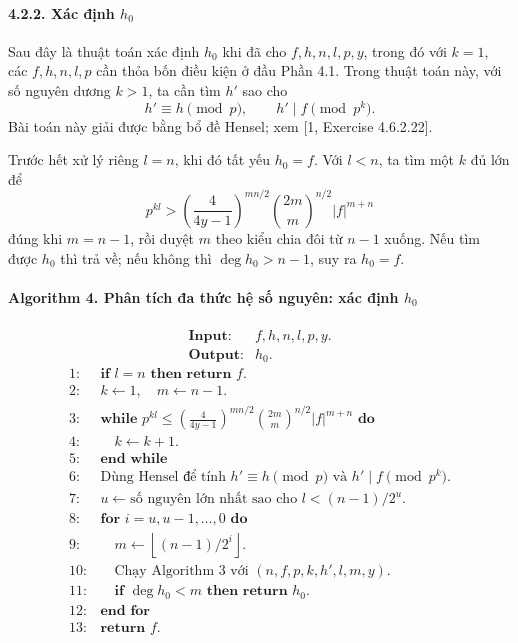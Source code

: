 \documentclass[11pt]{article}
\begin{document}
\paragraph{4.2.2. Xác định \(h_0\)}

Sau đây là thuật toán xác định \(h_0\) khi đã cho \(f,h,n,l,p,y\), trong đó
với \(k=1\), các \(f,h,n,l,p\) cần thỏa bốn điều kiện ở đầu Phần 4.1. Trong
thuật toán này, với số nguyên dương \(k>1\), ta cần tìm \(h'\) sao cho
\[
  h'\equiv h\pmod p,\qquad h'\mid f\pmod {p^k}.
\]
Bài toán này giải được bằng bổ đề Hensel; xem [1, Exercise 4.6.2.22].

Trước hết xử lý riêng \(l=n\), khi đó tất yếu \(h_0=f\). Với \(l<n\), ta tìm
một \(k\) đủ lớn để
\[
  p^{kl}>
  \left(\frac{4}{4y-1}\right)^{mn/2}
  \binom{2m}{m}^{n/2}|f|^{m+n}
\]
đúng khi \(m=n-1\), rồi duyệt \(m\) theo kiểu chia đôi từ \(n-1\) xuống. Nếu
tìm được \(h_0\) thì trả về; nếu không thì \(\deg h_0>n-1\), suy ra \(h_0=f\).

\paragraph{Algorithm 4. Phân tích đa thức hệ số nguyên: xác định \(h_0\)}
\[
\begin{array}{ll}
\textbf{Input:} & f,h,n,l,p,y.\\
\textbf{Output:} & h_0.
\end{array}
\]
\[
\begin{array}{rl}
1:& \textbf{if } l=n \textbf{ then return } f.\\
2:& k\leftarrow1,\quad m\leftarrow n-1.\\
3:& \textbf{while } p^{kl}\le
       \left(\frac{4}{4y-1}\right)^{mn/2}
       \binom{2m}{m}^{n/2}|f|^{m+n} \textbf{ do}\\
4:& \quad k\leftarrow k+1.\\
5:& \textbf{end while}\\
6:& \text{Dùng Hensel để tính } h' \equiv h\pmod p
       \text{ và } h'\mid f\pmod {p^k}.\\
7:& u\leftarrow \text{số nguyên lớn nhất sao cho } l<(n-1)/2^u.\\
8:& \textbf{for } i=u,u-1,\ldots,0 \textbf{ do}\\
9:& \quad m\leftarrow \left\lfloor (n-1)/2^i\right\rfloor.\\
10:& \quad \text{Chạy Algorithm 3 với } (n,f,p,k,h',l,m,y).\\
11:& \quad \textbf{if } \deg h_0<m \textbf{ then return } h_0.\\
12:& \textbf{end for}\\
13:& \textbf{return } f.
\end{array}
\]
\end{document}
